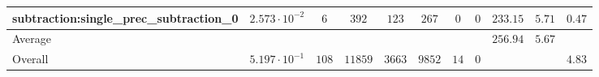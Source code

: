 \begin{tabular}{|l|c|c|c|c|c|c|c|c|c|c|}
subtraction:single\_prec\_subtraction\_0         & $ 2.573 \cdot 10^{-2} $ & $ 6      $ & $ 392   $ & $ 123  $ & $ 267   $ & $ 0  $ & $ 0 $ & $ 233.15      $ & $ 5.71    $ & $ 0.47    $ \\
\hline
Average                                          & $                     $ & $        $ & $       $ & $      $ & $       $ & $    $ & $   $ & $ 256.94      $ & $ 5.67    $ & $         $ \\
\hline
Overall                                          & $ 5.197 \cdot 10^{-1} $ & $ 108    $ & $ 11859 $ & $ 3663 $ & $ 9852  $ & $ 14 $ & $ 0 $ & $             $ & $         $ & $ 4.83    $ \\
\hline
\end{tabular}
